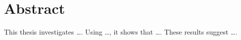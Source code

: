\chapter*{Abstract}
This thesis investigates \ldots. Using \ldots, it shows that \ldots. These
results suggest \ldots.
